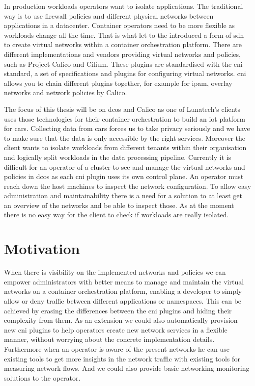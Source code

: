 In production workloads operators want to isolate applications. The traditional way is to use firewall policies and different physical networks between applications in a datacenter. Container operators need to be more flexible as workloads change all the time. That is what let to the introduced a form of \gls{sdn} to create virtual networks within a container orchestration platform.  There are different implementations and vendors providing virtual networks and policies, such as Project Calico\cite{calico} and Cilium\cite{cilium}. These plugins are standardised with the \gls{cni}\cite{cni} standard, a set of specifications and plugins for configuring virtual networks. \Gls{cni} allows you to chain different plugins together, for example for \gls{ipam}, overlay networks and network policies by Calico.

The focus of this thesis will be on \gls{dcos} and Calico as one of Lunatech's clients uses those technologies for their container orchestration to build an \gls{iot} platform for cars. Collecting data from cars forces us to take privacy seriously and we have to make sure that the data is only accessible by the right services. Moreover the client wants to isolate workloads from different tenants within their organisation and logically split workloads in the data processing pipeline. Currently it is difficult for an operator of a cluster to see and manage the virtual networks and policies in \gls{dcos} as each \gls{cni} plugin uses its own control plane. An operator must reach down the host machines to inspect the network configuration. To allow easy administration and maintainability there is a need for a solution to at least get an overview of the networks and be able to inspect those. As at the moment there is no easy way for the client to check if workloads are really isolated. 

\section{Motivation}
\label{motiviation}
When there is visibility on the implemented networks and policies we can empower administrators with better means to manage and maintain the virtual networks on a container orchestration platform, enabling a developer to simply allow or deny traffic between different applications or namespaces. This can be achieved by erasing the differences between the \gls{cni} plugins and hiding their complexity from them. As an extension we could also automatically provision new \gls{cni} plugins to help operators create new network services in a flexible manner, without worrying about the concrete implementation details. Furthermore when an operator is aware of the present networks he can use existing tools to get more insights in the network traffic with existing tools for measuring network flows. And we could also provide basic networking monitoring solutions to the operator.

